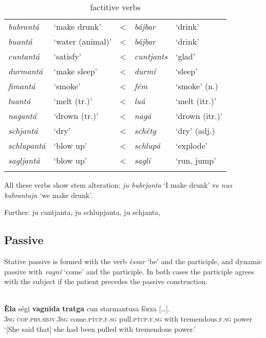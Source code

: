 \begin{table}
	\caption{factitive verbs}
	\label{factanta}
	\begin{tabular}{lllll}
		\lsptoprule
		\textit{bubrantá} &`make drunk' & < & \textit{bájbar} & `drink'\\
		\textit{buantá} & `water (animal)' & < & \textit{bájbar} & `drink'\\
		\textit{cuntantá} &`satisfy' & < & \textit{cuntjants} & `glad'\\
		\textit{durmantá} & `make sleep' & < & \textit{durmí} & `sleep'\\
		\textit{fimantá} &`smoke' & < & \textit{fém} & `smoke' (n.)\\
		\textit{luantá}	&`melt (tr.)' & < &\textit{luá} & `melt (itr.)'\\
		\textit{nagantá}	&`drown (tr.)' & < & \textit{nagá} & `drown (itr.)'\\
		\textit{schjantá} & `dry' & < & \textit{schétg} & `dry' (adj.)\\
		\textit{schlupantá} & `blow up'&	< & \textit{schlupá} & `explode'\\
		\textit{sagljantá} & `blow up' & < & \textit{saglí} & `run, jump'\\
		
		\lspbottomrule
	\end{tabular}
\end{table}

All these verbs show stem alteration: \textit{ju bubrjanta} `I make drunk' vs \textit{nus bubrantajn} `we make drunk'.

Further: ju cuntjanta, ju schlupjanta, ju schjanta, 

\subsection{Passive}
Stative passive is formed with the verb \textit{èssar} `be' and the participle, and dynamic passive with \textit{vagní} ‘come’ and the participle. In both cases the participle agrees with the subject if the patient precedes the passive construction.

 \ea\label{}
\\
\gll \textbf{Èla} ségi \textbf{vagnida} \textbf{tratga} cun starmantusa fòrza […].\\
\textsc{3sg} \textsc{cop.prs.sbjv.3sg} come.\textsc{ptcp.f.sg} pull.\textsc{ptcp.f.sg} with tremendous.\textsc{f.sg} power\\
\glt `[She said that] she had been pulled with tremendous power.'
\z

